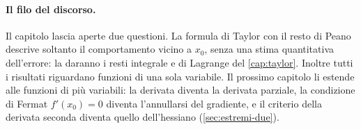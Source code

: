 \paragraph{Il filo del discorso.} Il capitolo lascia aperte due questioni. La formula di
Taylor con il resto di Peano descrive soltanto il comportamento vicino a $x_{0}$, senza
una stima quantitativa dell'errore: la daranno i resti integrale e di Lagrange del
\cref{cap:taylor}. Inoltre tutti i risultati riguardano funzioni di una sola variabile.
Il prossimo capitolo li estende alle funzioni di più variabili: la derivata diventa la
derivata parziale, la condizione di Fermat $f'(x_{0})=0$ diventa l'annullarsi del
gradiente, e il criterio della derivata seconda diventa quello dell'hessiano
(\cref{sec:estremi-due}).
